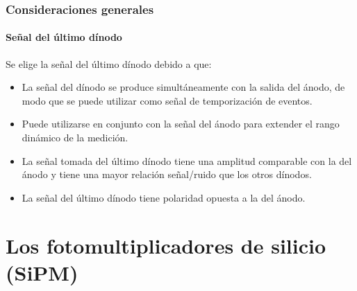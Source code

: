 \documentclass{beamer}
\begin{document}
\begin{frame}
\frametitle{Consideraciones generales}
\framesubtitle{Señal del último dínodo}
\begin{block}{Se elige la señal del último dínodo debido a que:}
\begin{itemize}
\item La señal del dínodo se produce simultáneamente con la
salida del ánodo, de modo que se puede utilizar como
señal de temporización de eventos.
\item Puede utilizarse en conjunto con la señal del ánodo para
extender el rango dinámico de la medición.
\item La señal tomada del último dínodo tiene una amplitud
comparable con la del ánodo y tiene una mayor relación
señal/ruido que los otros dínodos.
\item La señal del último dínodo tiene polaridad opuesta a la
del ánodo.
\end{itemize}
\end{block}
\end{frame}

\section{Los fotomultiplicadores de silicio (SiPM)}

\begin{frame}
\begin{center}
\Huge{\color{blue}{Los SiPM (o MPPC)}} \\
\begin{center}
\end{center}
\end{center}
\end{frame}
\end{document}
